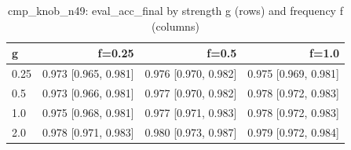 \begin{table}[t]
\centering
\small
\begin{tabular}{lrrr}
\toprule
g & f=0.25 & f=0.5 & f=1.0 \\
\midrule
0.25 & 0.973 [0.965, 0.981] & 0.976 [0.970, 0.982] & 0.975 [0.969, 0.981] \\
0.5 & 0.973 [0.966, 0.981] & 0.977 [0.970, 0.982] & 0.978 [0.972, 0.983] \\
1.0 & 0.975 [0.968, 0.981] & 0.977 [0.971, 0.983] & 0.978 [0.972, 0.983] \\
2.0 & 0.978 [0.971, 0.983] & 0.980 [0.973, 0.987] & 0.979 [0.972, 0.984] \\
\bottomrule
\end{tabular}
\caption{cmp\_knob\_n49: eval\_acc\_final by strength g (rows) and frequency f (columns)}
\label{tab:plasticity_cmp_knob_n49_eval_acc_final}
\end{table}